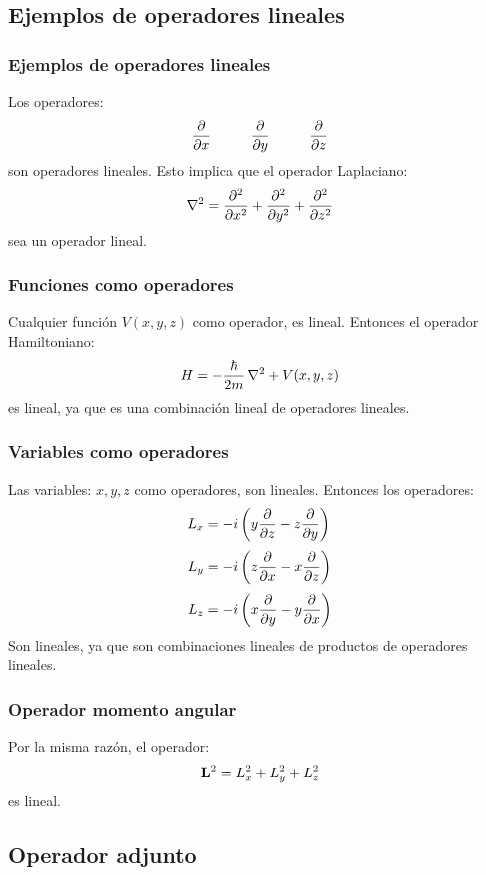 \documentclass[12pt]{beamer}
\begin{document}
\subsection{Ejemplos de operadores lineales}

\begin{frame}
\frametitle{Ejemplos de operadores lineales}
Los operadores:
\pause
\begin{align*}
\pdv{x} \hspace{1cm} \pdv{y} \hspace{1cm} \pdv{z} 
\end{align*}
son operadores lineales. \pause Esto implica que el operador Laplaciano:
\begin{align*}
\laplacian = \pdv[2]{x} + \pdv[2]{y} + \pdv[2]{z}
\end{align*}
sea un operador lineal.
\end{frame}
\begin{frame}
\frametitle{Funciones como operadores}
Cualquier función $V(x, y, z)$ como operador, es lineal. \pause Entonces el operador Hamiltoniano:
\begin{align*}
H = - \dfrac{\hbar}{2 m} \, \laplacian + V(x, y, z)
\end{align*}
\pause
es lineal, ya que es una combinación lineal de operadores lineales.
\end{frame}
\begin{frame}
\frametitle{Variables como operadores}
Las variables: \pause $x, y, z$ como operadores, son lineales. \pause Entonces los operadores:
\pause
\begin{align*}
L_{x} &= -i \left( y \pdv{z} - z \pdv{y} \right) \\[0.25em]
L_{y} &= -i \left( z \pdv{x} - x \pdv{z} \right) \\[0.25em]
L_{z} &= -i \left( x \pdv{y} - y \pdv{x} \right)
\end{align*}
\pause
Son lineales, ya que son combinaciones lineales de productos de operadores lineales.
\end{frame}
\begin{frame}
\frametitle{Operador momento angular}
Por la misma razón, el operador:
\begin{align*}
\vb{L}^{2} = L_{x}^{2} + L_{y}^{2} + L_{z}^{2}
\end{align*}
es lineal.
\end{frame}

\subsection{Operador adjunto}
\end{document}
